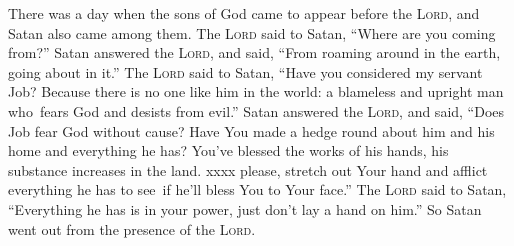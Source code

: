 
\begin{inparaenum}
    
     There was a day when the sons of God came to appear before the \textsc{Lord}, and Satan also came among them.%
     The \textsc{Lord} said to Satan, ``Where are you coming from?'' Satan answered the \textsc{Lord}, and said, ``From roaming around in the earth, going about in it.''%
     The \textsc{Lord} said to Satan, ``Have you considered my servant Job? Because there is no one like him in the world: a blameless and upright man who\understood\ fears God and desists from evil.''%
     Satan answered the \textsc{Lord}, and said, ``Does Job fear God without cause?%
     Have You made a hedge round about him and his home and everything he has? You've blessed the works of his hands, his substance increases in the land.%
     xxxx please, stretch out Your hand and afflict everything he has to see\understood\ if he'll bless You to Your face.''%
     The \textsc{Lord} said to Satan, ``Everything he has is in your power, just don't lay a hand on him.'' So Satan went out from the presence of the \textsc{Lord}.%
    
     \smallskip%
    
    \pvba{}%
    
    \pvba{}%
    
    {\noindent{} \smallskip}%
    
    \pvbb{}{}%
    
    \pvba{}%
    
    \pvba{}%
    
    {\noindent{} \smallskip}%
    
    \pvbb{}{}%
    
    
    \pvbb{}{}%
    
    \pvba{}%
    
    {\noindent{} \smallskip}%
    
    \pveb{}{}%
    \pveb{}{}%
    
    {\noindent{} }%
\end{inparaenum}
